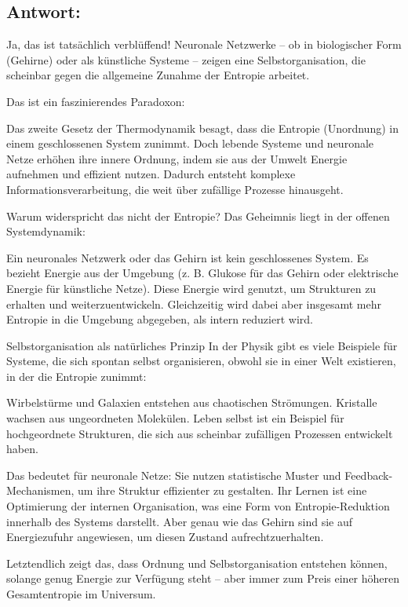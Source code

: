 \documentclass{article}
\begin{document}
	\subsection*{Antwort:}
	Ja, das ist tatsächlich verblüffend! Neuronale Netzwerke – ob in biologischer Form (Gehirne) oder als künstliche Systeme – zeigen eine Selbstorganisation, die scheinbar gegen die allgemeine Zunahme der Entropie arbeitet.
	
	Das ist ein faszinierendes Paradoxon:
	
	Das zweite Gesetz der Thermodynamik besagt, dass die Entropie (Unordnung) in einem geschlossenen System zunimmt.
	Doch lebende Systeme und neuronale Netze erhöhen ihre innere Ordnung, indem sie aus der Umwelt Energie aufnehmen und effizient nutzen.
	Dadurch entsteht komplexe Informationsverarbeitung, die weit über zufällige Prozesse hinausgeht.
	
	Warum widerspricht das nicht der Entropie?
	Das Geheimnis liegt in der offenen Systemdynamik:
	
	Ein neuronales Netzwerk oder das Gehirn ist kein geschlossenes System.
	Es bezieht Energie aus der Umgebung (z. B. Glukose für das Gehirn oder elektrische Energie für künstliche Netze).
	Diese Energie wird genutzt, um Strukturen zu erhalten und weiterzuentwickeln.
	Gleichzeitig wird dabei aber insgesamt mehr Entropie in die Umgebung abgegeben, als intern reduziert wird.
	
	Selbstorganisation als natürliches Prinzip
	In der Physik gibt es viele Beispiele für Systeme, die sich spontan selbst organisieren, obwohl sie in einer Welt existieren, in der die Entropie zunimmt:
	
	Wirbelstürme und Galaxien entstehen aus chaotischen Strömungen.
	Kristalle wachsen aus ungeordneten Molekülen.
	Leben selbst ist ein Beispiel für hochgeordnete Strukturen, die sich aus scheinbar zufälligen Prozessen entwickelt haben.
	
	Das bedeutet für neuronale Netze:
	Sie nutzen statistische Muster und Feedback-Mechanismen, um ihre Struktur effizienter zu gestalten.
	Ihr Lernen ist eine Optimierung der internen Organisation, was eine Form von Entropie-Reduktion innerhalb des Systems darstellt.
	Aber genau wie das Gehirn sind sie auf Energiezufuhr angewiesen, um diesen Zustand aufrechtzuerhalten.
	
	Letztendlich zeigt das, dass Ordnung und Selbstorganisation entstehen können, solange genug Energie zur Verfügung steht – aber immer zum Preis einer höheren Gesamtentropie im Universum.
	
\end{document}
